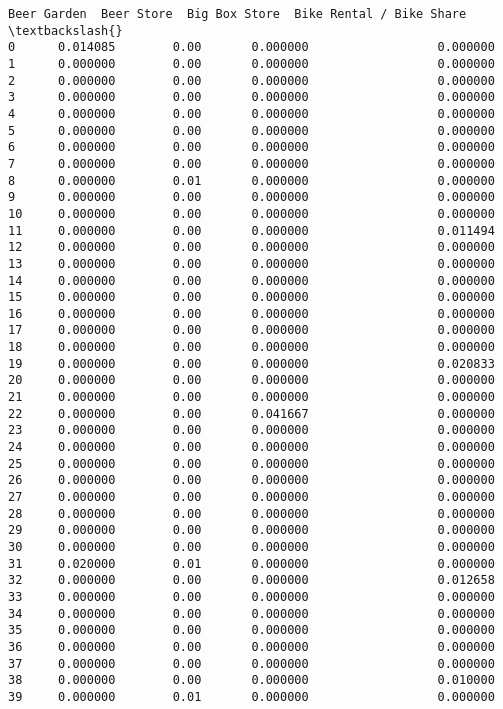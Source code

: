 \documentclass[11pt]{article}
\begin{document}
\begin{tcolorbox}[breakable, size=fbox, boxrule=.5pt, pad at break*=1mm, opacityfill=0]
\begin{Verbatim}[commandchars=\\\{\}]
    Beer Garden  Beer Store  Big Box Store  Bike Rental / Bike Share  \textbackslash{}
0      0.014085        0.00       0.000000                  0.000000
1      0.000000        0.00       0.000000                  0.000000
2      0.000000        0.00       0.000000                  0.000000
3      0.000000        0.00       0.000000                  0.000000
4      0.000000        0.00       0.000000                  0.000000
5      0.000000        0.00       0.000000                  0.000000
6      0.000000        0.00       0.000000                  0.000000
7      0.000000        0.00       0.000000                  0.000000
8      0.000000        0.01       0.000000                  0.000000
9      0.000000        0.00       0.000000                  0.000000
10     0.000000        0.00       0.000000                  0.000000
11     0.000000        0.00       0.000000                  0.011494
12     0.000000        0.00       0.000000                  0.000000
13     0.000000        0.00       0.000000                  0.000000
14     0.000000        0.00       0.000000                  0.000000
15     0.000000        0.00       0.000000                  0.000000
16     0.000000        0.00       0.000000                  0.000000
17     0.000000        0.00       0.000000                  0.000000
18     0.000000        0.00       0.000000                  0.000000
19     0.000000        0.00       0.000000                  0.020833
20     0.000000        0.00       0.000000                  0.000000
21     0.000000        0.00       0.000000                  0.000000
22     0.000000        0.00       0.041667                  0.000000
23     0.000000        0.00       0.000000                  0.000000
24     0.000000        0.00       0.000000                  0.000000
25     0.000000        0.00       0.000000                  0.000000
26     0.000000        0.00       0.000000                  0.000000
27     0.000000        0.00       0.000000                  0.000000
28     0.000000        0.00       0.000000                  0.000000
29     0.000000        0.00       0.000000                  0.000000
30     0.000000        0.00       0.000000                  0.000000
31     0.020000        0.01       0.000000                  0.000000
32     0.000000        0.00       0.000000                  0.012658
33     0.000000        0.00       0.000000                  0.000000
34     0.000000        0.00       0.000000                  0.000000
35     0.000000        0.00       0.000000                  0.000000
36     0.000000        0.00       0.000000                  0.000000
37     0.000000        0.00       0.000000                  0.000000
38     0.000000        0.00       0.000000                  0.010000
39     0.000000        0.01       0.000000                  0.000000


\end{Verbatim}
\end{tcolorbox}
\end{document}
